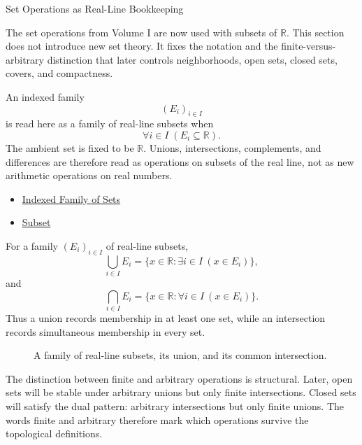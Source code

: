 \label{sec:set-operations-on-real-line}

\begin{topicbox}{Set Operations as Real-Line Bookkeeping}
\begin{exposition}
The set operations from Volume I are now used with subsets of \(\mathbb R\).
This section does not introduce new set theory. It fixes the notation and the
finite-versus-arbitrary distinction that later controls neighborhoods, open
sets, closed sets, covers, and compactness.
\end{exposition}
\end{topicbox}

\begin{remark*}[Interpretation]
An indexed family
\[
  (E_i)_{i\in I}
\]
is read here as a family of real-line subsets when
\[
  \forall i\in I\;(E_i\subseteq\mathbb R).
\]
The ambient set is fixed to be \(\mathbb R\). Unions, intersections,
complements, and differences are therefore read as operations on subsets of
the real line, not as new arithmetic operations on real numbers.
\end{remark*}
\begin{dependencies}
\begin{itemize}
  \item \hyperref[def:indexed-family]{Indexed Family of Sets}
  \item \hyperref[def:subset]{Subset}
\end{itemize}
\end{dependencies}

\begin{remark*}[Interpretation]
For a family \((E_i)_{i\in I}\) of real-line subsets,
\[
  \bigcup_{i\in I}E_i
  =
  \{x\in\mathbb R:\exists i\in I\ (x\in E_i)\},
\]
and
\[
  \bigcap_{i\in I}E_i
  =
  \{x\in\mathbb R:\forall i\in I\ (x\in E_i)\}.
\]
Thus a union records membership in at least one set, while an intersection
records simultaneous membership in every set.
\end{remark*}

\begin{figure}[htbp]
\centering

\caption{A family of real-line subsets, its union, and its common intersection.}
\label{fig:set-operations-on-real-line}
\end{figure}

\begin{remark*}[Interpretation]
The distinction between finite and arbitrary operations is structural. Later,
open sets will be stable under arbitrary unions but only finite intersections.
Closed sets will satisfy the dual pattern: arbitrary intersections but only
finite unions. The words finite and arbitrary therefore mark which operations
survive the topological definitions.
\end{remark*}


